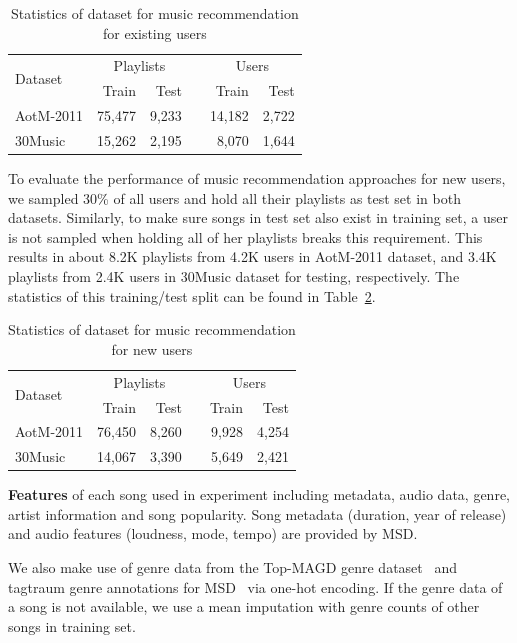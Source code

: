 \begin{table}[!h]
\centering
\caption{Statistics of dataset for music recommendation for existing users}
\label{tab:stats_warm}
\begin{tabular}{lrrcrr}
\toprule
\multirow{2}{*}{Dataset}  & \multicolumn{2}{c}{Playlists} && \multicolumn{2}{c}{Users} \\ \cmidrule{2-3} \cmidrule{5-6}
                          & Train & Test && Train & Test \\
\midrule
AotM-2011 & 75,477 & 9,233 && 14,182 & 2,722 \\
30Music   & 15,262 & 2,195 &&  8,070 & 1,644 \\
\bottomrule
\end{tabular}
\end{table}

To evaluate the performance of music recommendation approaches for new users,
we sampled 30\% of all users and hold all their playlists as test set in both datasets.
Similarly, to make sure songs in test set also exist in training set,
a user is not sampled when holding all of her playlists breaks this requirement.
This results in about 8.2K playlists from 4.2K users in AotM-2011 dataset,
and 3.4K playlists from 2.4K users in 30Music dataset for testing, respectively.
The statistics of this training/test split can be found in Table~\ref{tab:stats_cold}.

\begin{table}[!h]
\centering
\caption{Statistics of dataset for music recommendation for new users}
\label{tab:stats_cold}
\begin{tabular}{lrrcrr}
\toprule
\multirow{2}{*}{Dataset}  & \multicolumn{2}{c}{Playlists} && \multicolumn{2}{c}{Users} \\ \cmidrule{2-3} \cmidrule{5-6}
                          & Train & Test && Train & Test \\
\midrule
AotM-2011 & 76,450 & 8,260 && 9,928 & 4,254 \\       
30Music   & 14,067 & 3,390 && 5,649 & 2,421 \\
\bottomrule
\end{tabular}
\end{table}


{\bf Features} of each song used in experiment including metadata, audio data, genre, artist information and song popularity.
Song metadata (\eg duration, year of release) and audio features (\eg loudness, mode, tempo) are provided by MSD.

We also make use of genre data from the Top-MAGD genre dataset~\cite{schindler2012facilitating} 
and tagtraum genre annotations for MSD~\cite{schreiber2015improving} via one-hot encoding.
If the genre data of a song is not available, we use a mean imputation with genre counts of other songs in training set.

